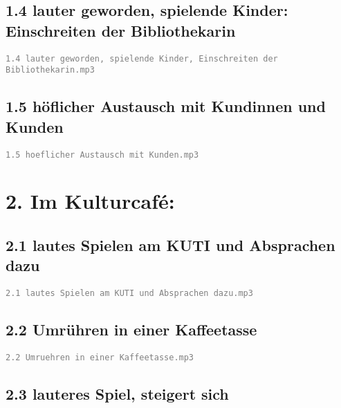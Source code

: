 \documentclass[a4paper,
fontsize=11pt,
oneside,
numbers=noperiodatend,
parskip=half-,
bibliography=totoc,
final
]{scrartcl}
\begin{document}
\hypertarget{lauter-geworden-spielende-kinder-einschreiten-der-bibliothekarin}{%
\subsection{1.4 lauter geworden, spielende Kinder: Einschreiten der
Bibliothekarin}\label{lauter-geworden-spielende-kinder-einschreiten-der-bibliothekarin}}

\textcolor{gray}{\texttt{1.4 lauter geworden, spielende Kinder, Einschreiten der Bibliothekarin.mp3}}


\hypertarget{huxf6flicher-austausch-mit-kundinnen-und-kunden}{%
\subsection{1.5 höflicher Austausch mit Kundinnen und
Kunden}\label{huxf6flicher-austausch-mit-kundinnen-und-kunden}}

\textcolor{gray}{\texttt{1.5 hoeflicher Austausch mit Kunden.mp3}}


\hypertarget{im-kulturcafuxe9}{%
\section{2. Im Kulturcafé:}\label{im-kulturcafuxe9}}


\hypertarget{lautes-spielen-am-kuti-und-absprachen-dazu}{%
\subsection{2.1 lautes Spielen am KUTI und Absprachen
dazu}\label{lautes-spielen-am-kuti-und-absprachen-dazu}}

\textcolor{gray}{\texttt{2.1 lautes Spielen am KUTI und Absprachen dazu.mp3}}


\hypertarget{umruxfchren-in-einer-kaffeetasse}{%
\subsection{2.2 Umrühren in einer
Kaffeetasse}\label{umruxfchren-in-einer-kaffeetasse}}

\textcolor{gray}{\texttt{2.2 Umruehren in einer Kaffeetasse.mp3}}


\hypertarget{lauteres-spiel-steigert-sich}{%
\subsection{2.3 lauteres Spiel, steigert
sich}\label{lauteres-spiel-steigert-sich}}
\end{document}
